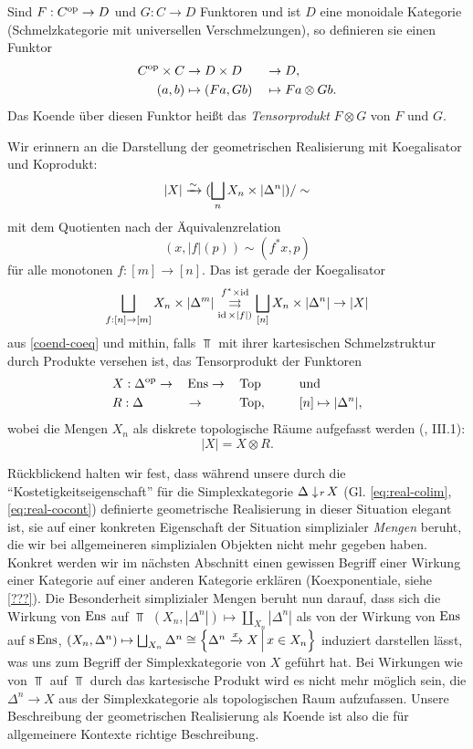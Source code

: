Sind $F: C^\mathrm{op} \to D$ und $G: C \to D$ Funktoren und ist $D$ eine
monoidale Kategorie (Schmelzkategorie mit universellen
Verschmelzungen), so definieren sie einen Funktor
\begin{alignat*}{4}
  C^\mathrm{op} \times C &\to D \times D &&\to D, \\
  (a, b) &\mapsto (Fa, Gb) &&\mapsto Fa \otimes Gb.
\end{alignat*}
Das Koende über diesen Funktor heißt das \emph{Tensorprodukt} $F
\otimes G$ von $F$ und $G$.

Wir erinnern an die Darstellung der geometrischen Realisierung mit
Koegalisator und Koprodukt:
\[ |X| \xrightarrow[]{\sim} (\bigsqcup_n X_n \times |\Delta^n|) / \sim \]
mit dem Quotienten nach der Äquivalenzrelation
\[ (x, |f|(p)) \sim (f^* x, p) \]
für alle monotonen $f: [m] \to [n]$. Das ist gerade der Koegalisator
 \[ \bigsqcup_{f: [n] \to [m]} X_n \times |\Delta^m|
 \overset{f^* \times \operatorname{id}}{\underset{\operatorname{id} \times |f|)}{\rightrightarrows}}
 \bigsqcup_{[n]} X_n \times |\Delta^n| \to |X| \]
aus \ref{coend-coeq} und mithin, falls $\Top$ mit ihrer kartesischen
Schmelzstruktur durch Produkte versehen ist, das Tensorprodukt der
Funktoren
\begin{alignat*}{4}
  &X: \Delta^\mathrm{op} \to &&\operatorname{Ens} \to &&\operatorname{Top} \qquad &&\text{und} \\
  &R: \Delta &&\to &&\operatorname{Top}, && [n] \mapsto |\Delta^n|,
\end{alignat*}
wobei die Mengen $X_n$ als diskrete topologische Räume aufgefasst
werden (\cite{Moer}, III.1):
\[ |X| = X \otimes R. \]

\begin{bem} \label{coend-correct-real}
  Rückblickend halten wir fest, dass während unsere durch die
  ``Kostetigkeitseigenschaft'' für die Simplexkategorie
  $\Delta \downarrow \! {\scriptstyle r} \, X$ (Gl. \ref{eq:real-colim},
  \ref{eq:real-cocont}) definierte geometrische Realisierung in dieser
  Situation elegant ist, sie auf einer konkreten Eigenschaft der
  Situation simplizialer \emph{Mengen} beruht, die wir bei
  allgemeineren simplizialen Objekten nicht mehr gegeben
  haben. Konkret werden wir im nächsten Abschnitt einen gewissen
  Begriff einer Wirkung einer Kategorie auf einer anderen Kategorie
  erklären (Koexponentiale, siehe \ref{???}). Die Besonderheit
  simplizialer Mengen beruht nun darauf, dass sich die Wirkung von
  $\operatorname{Ens}$ auf $\Top$ $(X_n, |\Delta^n|) \mapsto \coprod_{X_n}
  |\Delta^n|$ als von der Wirkung von $\operatorname{Ens}$ auf $\operatorname{s}\operatorname{Ens}$, $(X_n,
  \Delta^n) \mapsto \bigsqcup_{X_n} \Delta^n \cong \left\{ \Delta^n
    \xrightarrow{x} X \,\middle|\, x \in X_n \right\}$ induziert darstellen lässt, was uns
  zum Begriff der Simplexkategorie von $X$ geführt hat. Bei Wirkungen
  wie von $\Top$ auf $\Top$ durch das kartesische Produkt wird es
  nicht mehr möglich sein, die $\Delta^n \to X$ aus der
  Simplexkategorie als topologischen Raum aufzufassen. Unsere
  Beschreibung der geometrischen Realisierung als Koende ist also die
  für allgemeinere Kontexte richtige Beschreibung.
\end{bem}

